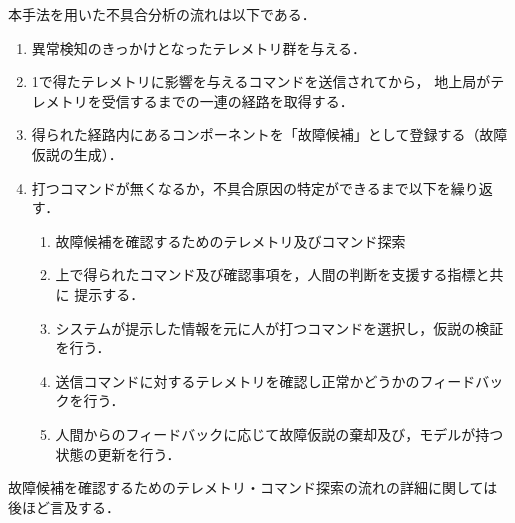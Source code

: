 \documentclass[11pt]{jsreport}
\begin{document}
本手法を用いた不具合分析の流れは以下である．
\begin{enumerate}[1]
   \item 異常検知のきっかけとなったテレメトリ群を与える．
   \item 1で得たテレメトリに影響を与えるコマンドを送信されてから，
   地上局がテレメトリを受信するまでの一連の経路を取得する．
   \item 得られた経路内にあるコンポーネントを「故障候補」として登録する（故障仮説の生成）．
   \item 打つコマンドが無くなるか，不具合原因の特定ができるまで以下を繰り返す．
   \begin{enumerate}[\textrm{4.}1]
      \item 故障候補を確認するためのテレメトリ及びコマンド探索
      \item 上で得られたコマンド及び確認事項を，人間の判断を支援する指標と共に
      提示する．
      \item システムが提示した情報を元に人が打つコマンドを選択し，仮説の検証を行う．
      \item 送信コマンドに対するテレメトリを確認し正常かどうかのフィードバックを行う．
      \item 人間からのフィードバックに応じて故障仮説の棄却及び，モデルが持つ状態の更新を行う．
   \end{enumerate}
\end{enumerate}
%
故障候補を確認するためのテレメトリ・コマンド探索の流れの詳細に関しては
後ほど言及する．


\end{document}
